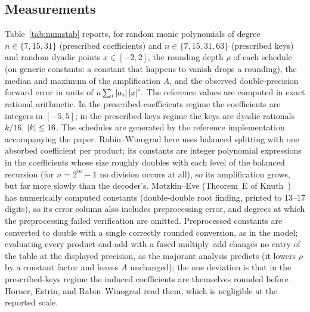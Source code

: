 \subsection{Measurements}

Table~\ref{tab:numstab} reports, for random monic polynomials of degree
$n\in\{7,15,31\}$ (prescribed coefficients) and $n\in\{7,15,31,63\}$
(prescribed keys) and random dyadic points $x\in[-2,2]$, the rounding depth
$\rho$ of each schedule (on generic constants: a constant that happens to
vanish drops a rounding), the median and maximum of the amplification $A$, and
the observed double-precision forward error in units of
$u\sum_i\left\lvert a_i\right\rvert\left\lvert x\right\rvert^i$.  The reference values are computed in exact
rational arithmetic.  In the prescribed-coefficients regime the coefficients
are integers in $[-5,5]$; in the prescribed-keys regime the keys are dyadic
rationals $k/16$, $\left\lvert k\right\rvert\le16$.  The schedules are generated by the
reference implementation accompanying the paper.  Rabin--Winograd here uses
balanced splitting with one absorbed coefficient per product; its constants
are integer polynomial expressions in the coefficients whose size roughly
doubles with each level of the balanced recursion (for $n=2^m-1$ no division
occurs at all), so its amplification grows, but far more slowly than the
decoder's.  Motzkin--Eve (Theorem~E of
Knuth~\cite[\S4.6.4]{knuth1997seminumerical}) has numerically computed
constants (double-double root finding, printed to 13--17 digits), so its
error column also includes preprocessing error, and degrees at which the
preprocessing failed verification are omitted.  Preprocessed constants are
converted to double with a single correctly rounded conversion, as in the
model; evaluating every product-and-add with a fused multiply--add changes no
entry of the table at the displayed precision, as the majorant analysis
predicts (it lowers $\rho$ by a constant factor and leaves $A$ unchanged); the one deviation is that in the prescribed-keys regime the induced
coefficients are themselves rounded before Horner, Estrin, and Rabin--Winograd
read them, which is negligible at the reported scale.



